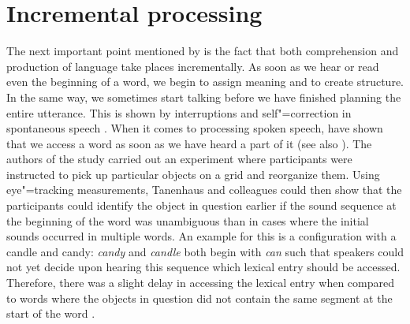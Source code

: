\section{Incremental processing}
\label{Abschnitt-Inkrementelle-Verarbeitung}

The next important point mentioned by \citet{SW2011a} is the fact that both comprehension and production of language take places incrementally.
As soon as we hear or read even the beginning of a word, we begin to assign meaning and to create structure.
In the same way, we sometimes start talking before we have finished planning the entire utterance.
This is shown by interruptions and self"=correction in spontaneous speech \citep{CW98a,CFT2002a}.
When it comes to processing spoken speech, \citet{TSKES96a} have shown that we access a word as soon
as we have heard a part of it (see also \citealp{Marslen-Wilson75a}).  The authors of the study carried out an experiment where participants were instructed
to pick up particular objects on a grid and reorganize them. Using eye"=tracking measurements,
Tanenhaus and colleagues could then show that the participants could identify the object in question
earlier if the sound sequence at the beginning of the word was unambiguous than in cases 
where the initial sounds occurred in multiple words. An example for this is a configuration with a candle and candy: \emph{candy} and \emph{candle}
both begin with \emph{can} such that speakers could not yet decide upon hearing this sequence which lexical entry should be accessed. Therefore, there
was a slight delay in accessing the lexical entry when compared to words where the objects in question did not contain the same segment at the
start of the word \citep[]{TSKES95a}.

